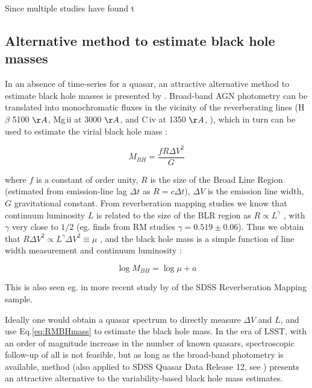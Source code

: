 \documentclass[twocolumn]{aastex62}
\begin{document}
Since multiple studies have found t


\subsection{Alternative method to estimate black hole masses}

In an absence of time-series for a quasar, an attractive alternative method to estimate black hole masses is presented by \citep{kozlowski2015}. Broad-band AGN photometry can be translated into monochromatic fluxes in the vicinity of the reverberating lines (H$\beta$ 5100 $\AA$, Mg\,{\sc ii} at 3000 $\AA$, and C\,{\sc iv} at 1350 $\AA$, \citealt{kozlowski2015}), which in turn can be used to estimate the virial black hole mass :

\begin{equation}
M_{BH} = \frac{f R \Delta V^{2}}{G}
\end{equation}

where $f$ is a constant of order unity, $R$ is the size of the Broad Line Region (estimated from  emission-line lag $\Delta t$ as $R = c \Delta t$), $\Delta V$ is the emission line width, $G$ gravitational constant. From reverberation mapping studies we know that continuum luminosity $L$ is related to the size of the BLR region as $R \propto L^{\gamma}$ \citep{vestergaard2006}, with $\gamma$ very close to $1/2$ (eg. \citealt{bentz2009} finds from RM studies $\gamma = 0.519 \pm 0.06$). Thus we obtain  that $R \Delta V^{2} \propto L^{\gamma} \Delta V^{2} \equiv \mu$ , and the black hole mass is a simple function of line width measurement  and continuum luminosity : 

\begin{equation}
\label{eq:RMBHmass}
\log{M_{BH}} = \log{\mu} + a 
\end{equation}

This is also seen eg. in more recent study by \citep{shen2018} of the SDSS Reverberation Mapping sample. 

Ideally one would obtain a quasar spectrum to directly measure $\Delta V$ and $L$, and use Eq.\ref{eq:RMBHmass} to estimate the black hole mass. In the era of LSST, with an order of magnitude increase in the number of known quasars, spectroscopic follow-up of all is not feasible, but as long as the broad-band photometry is available, \citep{kozlowski2015} method (also applied to SDSS Quasar Data Release 12, see \citealt{kozlowski2017b}) presents an attractive alternative to the variability-based black hole mass estimates. 
\end{document}
